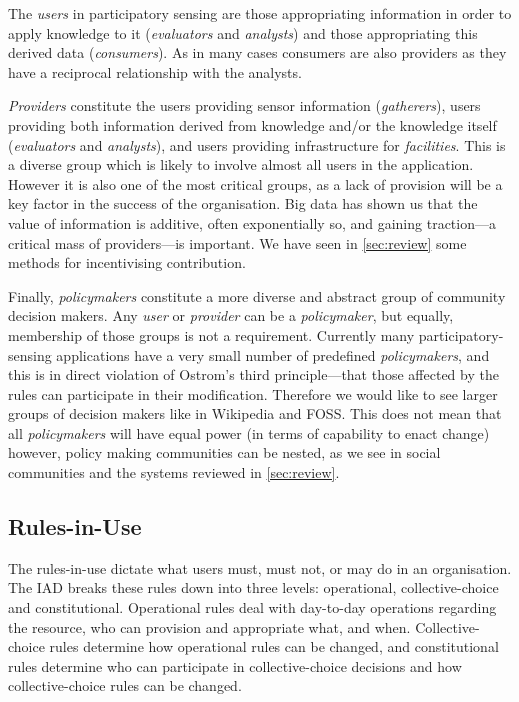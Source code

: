 The \emph{users} in participatory sensing are those appropriating information in order to apply knowledge to it (\emph{evaluators} and \emph{analysts}) and those appropriating this derived data (\emph{consumers}). As in many cases consumers are also providers as they have a reciprocal relationship with the analysts.

\emph{Providers} constitute the users providing sensor information (\emph{gatherers}), users providing both information derived from knowledge and/or the knowledge itself (\emph{evaluators} and \emph{analysts}), and users providing infrastructure for \emph{facilities}. This is a diverse group which is likely to involve almost all users in the application. However it is also one of the most critical groups, as a lack of provision will be a key factor in the success of the organisation. Big data has shown us that the value of information is additive, often exponentially so, and gaining traction---a critical mass of providers---is important. 
We have seen in \autoref{sec:review} some methods for incentivising contribution.

Finally, \emph{policymakers} constitute a more diverse and abstract group of community decision makers. Any \emph{user} or \emph{provider} can be a \emph{policymaker}, but equally, membership of those groups is not a requirement. 
Currently many parti\-cipatory-sensing applications have a very small number of predefined \emph{policymakers}, and this is in direct violation of Ostrom's third principle---that those affected by the rules can participate in their modification. 
Therefore we would like to see larger groups of decision makers like in Wikipedia and \ac{FOSS}. This does not mean that all \emph{policymakers} will have equal power (in terms of capability to enact change) however, policy making communities can be nested, as we see in social communities and the systems reviewed in \autoref{sec:review}.


\subsection{Rules-in-Use}

The rules-in-use dictate what users must, must not, or may do in an organisation. The \ac{IAD} breaks these rules down into three levels: operational, collective-choice and constitutional. Operational rules deal with day-to-day operations regarding the resource, who can provision and appropriate what, and when. 
Collective-choice rules determine how operational rules can be changed, and constitutional rules determine who can participate in collective-choice decisions and how collective-choice rules can be changed.

